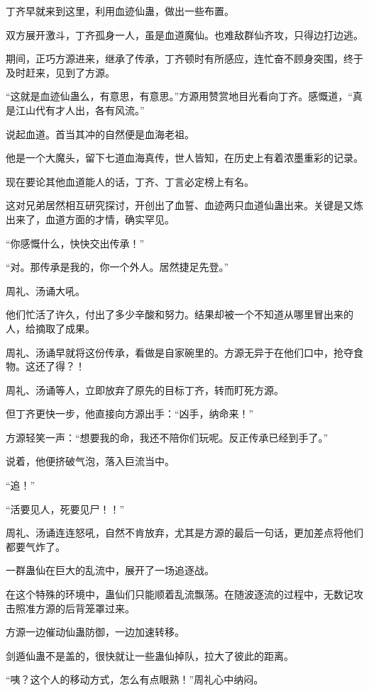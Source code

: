 \begin{this_body}
丁齐早就来到这里，利用血迹仙蛊，做出一些布置。

双方展开激斗，丁齐孤身一人，虽是血道魔仙。也难敌群仙齐攻，只得边打边逃。

期间，正巧方源进来，继承了传承，丁齐顿时有所感应，连忙奋不顾身突围，终于及时赶来，见到了方源。

“这就是血迹仙蛊么，有意思，有意思。”方源用赞赏地目光看向丁齐。感慨道，“真是江山代有才人出，各有风流。”

说起血道。首当其冲的自然便是血海老祖。

他是一个大魔头，留下七道血海真传，世人皆知，在历史上有着浓墨重彩的记录。

现在要论其他血道能人的话，丁齐、丁言必定榜上有名。

这对兄弟居然相互研究探讨，开创出了血誓、血迹两只血道仙蛊出来。关键是又炼出来了，血道方面的才情，确实罕见。

“你感慨什么，快快交出传承！”

“对。那传承是我的，你一个外人。居然捷足先登。”

周礼、汤诵大吼。

他们忙活了许久，付出了多少辛酸和努力。结果却被一个不知道从哪里冒出来的人，给摘取了成果。

周礼、汤诵早就将这份传承，看做是自家碗里的。方源无异于在他们口中，抢夺食物。这还了得？！

周礼、汤诵等人，立即放弃了原先的目标丁齐，转而盯死方源。

但丁齐更快一步，他直接向方源出手：“凶手，纳命来！”

方源轻笑一声：“想要我的命，我还不陪你们玩呢。反正传承已经到手了。”

说着，他便挤破气泡，落入巨流当中。

“追！”

“活要见人，死要见尸！！”

周礼、汤诵连连怒吼，自然不肯放弃，尤其是方源的最后一句话，更加差点将他们都要气炸了。

一群蛊仙在巨大的乱流中，展开了一场追逐战。

在这个特殊的环境中，蛊仙们只能顺着乱流飘荡。在随波逐流的过程中，无数记攻击照准方源的后背笼罩过来。

方源一边催动仙蛊防御，一边加速转移。

剑遁仙蛊不是盖的，很快就让一些蛊仙掉队，拉大了彼此的距离。

“咦？这个人的移动方式，怎么有点眼熟！”周礼心中纳闷。


\end{this_body}
